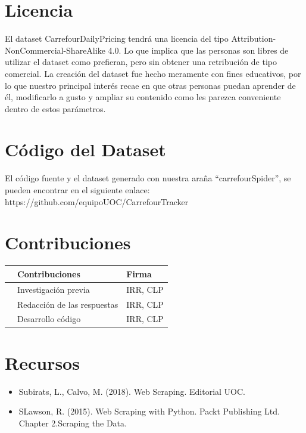 \documentclass{article}
\begin{document}
\section{Licencia}
El dataset CarrefourDailyPricing tendrá una licencia del tipo Attribution-NonCommercial-ShareAlike 4.0. Lo que implica que las personas son libres de utilizar el dataset como prefieran, pero sin obtener una retribución de tipo comercial. La creación del dataset fue hecho meramente con fines educativos, por lo que nuestro principal interés recae en que otras personas puedan aprender de él, modificarlo a gusto y ampliar su contenido como les parezca conveniente dentro de estos parámetros.

\pagebreak
\section{Código del Dataset}
El código fuente y el dataset generado con nuestra araña  “carrefourSpider”, se pueden encontrar en el siguiente enlace: https://github.com/equipoUOC/CarrefourTracker

\section{Contribuciones}

\begin{table}[H]
    \centering
    \begin{tabular}{rll}
    & Contribuciones & Firma \\
    \hline
    & Investigación previa & IRR, CLP  \\
    & Redacción de las respuestas & IRR, CLP \\
    & Desarrollo código & IRR, CLP \\
    \end{tabular}
\end{table}


\section{Recursos}
\begin{itemize}
    \item Subirats, L., Calvo, M. (2018). Web Scraping. Editorial UOC.
    \item SLawson, R. (2015). Web Scraping with Python. Packt Publishing Ltd. Chapter 2.Scraping the Data.

\end{itemize}
\end{document}
